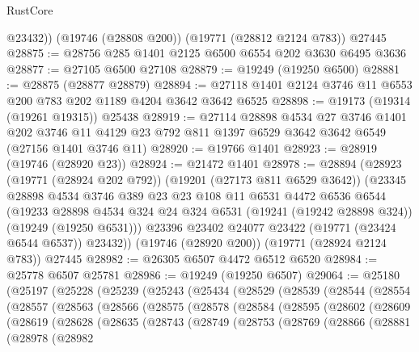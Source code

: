\begin{lexlean}{RustCore}
\begin{coremodule}
        @23432))
    (@19746 (@28808 @200))
    (@19771 (@28812 @2124 @783))
    @27445
@28875 := @28756 @285 @1401 @2125 @6500 @6554 @202 @3630 @6495 @3636
@28877 := @27105 @6500 @27108
@28879 := @19249 (@19250 @6500)
@28881 := @28875 (@28877 @28879)
@28894 := @27118 @1401 @2124 @3746 @11 @6553 @200 @783 @202 @1189 @4204 @3642 @3642 @6525
@28898 := @19173 (@19314 (@19261 @19315)) @25438
@28919 := @27114
    @28898
    @4534
    @27
    @3746
    @1401
    @202
    @3746
    @11
    @4129
    @23
    @792
    @811
    @1397
    @6529
    @3642
    @3642
    @6549
    (@27156 @1401 @3746 @11)
@28920 := @19766 @1401
@28923 := @28919 (@19746 (@28920 @23))
@28924 := @21472 @1401
@28978 := @28894
    (@28923
      (@19771 (@28924 @202 @792))
      (@19201 (@27173 @811 @6529 @3642))
      (@23345
        @28898
        @4534
        @3746
        @389
        @23
        @23
        @108
        @11
        @6531
        @4472
        @6536
        @6544
        (@19233
          @28898
          @4534
          @324
          @24
          @324
          @6531
          (@19241 (@19242 @28898 @324))
          (@19249 (@19250 @6531)))
        @23396
        @23402
        @24077
        @23422
        (@19771 (@23424 @6544 @6537))
        @23432))
    (@19746 (@28920 @200))
    (@19771 (@28924 @2124 @783))
    @27445
@28982 := @26305 @6507 @4472 @6512 @6520
@28984 := @25778 @6507 @25781
@28986 := @19249 (@19250 @6507)
@29064 := @25180
    (@25197
      (@25228
        (@25239
          (@25243
            (@25434
              (@28529
                (@28539
                  (@28544
                    (@28554
                      (@28557
                        (@28563
                          (@28566
                            (@28575
                              (@28578
                                (@28584
                                  (@28595
                                    (@28602
                                      (@28609
                                        (@28619
                                          (@28628
                                            (@28635
                                              (@28743
                                                (@28749
                                                  (@28753
                                                    (@28769
                                                      (@28866
                                                        (@28881
                                                          (@28978
                                                            (@28982

\end{coremodule}
\end{lexlean}
